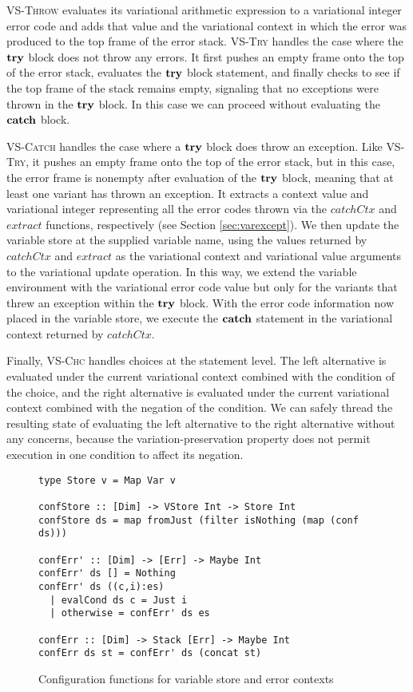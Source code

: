 \documentclass[12pt,oneside]{book}
\begin{document}
\textsc{VS-Throw} evaluates its variational arithmetic expression to a variational integer error code and adds that value and the variational context
in which the error was produced to the top frame of the error stack. \textsc{VS-Try} handles the case where the $\textbf{\textup{\textrm{try}}}$ block does not throw
any errors. It first pushes an empty frame onto the top of the error stack, evaluates the $\textbf{\textup{\textrm{try}}}$ block statement, and finally checks to see if
the top frame of the stack remains empty, signaling that no exceptions were thrown in the $\textbf{\textup{\textrm{try}}}$ block. In this case we can proceed without evaluating the $\textbf{\textup{\textrm{catch}}}$ block.

\textsc{VS-Catch} handles the case where a $\textbf{\textup{\textrm{try}}}$ block does throw an exception. Like \textsc{VS-Try}, it pushes an empty frame onto the top of the error
stack, but in this case, the error frame is nonempty after evaluation of the $\textbf{\textup{\textrm{try}}}$ block, meaning that at least one variant has thrown an exception.
It extracts a context value and variational integer representing all the error codes thrown via the $\mathit{catchCtx}$ and $\mathit{extract}$ functions, respectively (see
Section \ref{sec:varexcept}). We then update the variable store at the supplied variable name, using the values returned by $\mathit{catchCtx}$ and $\mathit{extract}$
as the variational context and variational value arguments to the variational update operation. In this way, we extend the variable environment with the variational
error code value but only for the variants that threw an exception within the $\textbf{\textup{\textrm{try}}}$ block. With the error code information now placed in the variable store,
we execute the $\textbf{\textup{\textrm{catch}}}$ statement in the variational context returned by $\mathit{catchCtx}$.

Finally, \textsc{VS-Chc} handles choices at the statement level. The left alternative is evaluated under the current variational context combined with the condition of
the choice, and the right alternative is evaluated under the current variational context combined with the negation of the condition.
We can safely thread the resulting state of evaluating the left alternative to the right alternative without any concerns, because the variation-preservation property
does not permit execution in one condition to affect its negation.

\begin{figure}
\begin{lstlisting}
type Store v = Map Var v

confStore :: [Dim] -> VStore Int -> Store Int
confStore ds = map fromJust (filter isNothing (map (conf ds)))

confErr' :: [Dim] -> [Err] -> Maybe Int
confErr' ds [] = Nothing
confErr' ds ((c,i):es)
  | evalCond ds c = Just i
  | otherwise = confErr' ds es

confErr :: [Dim] -> Stack [Err] -> Maybe Int
confErr ds st = confErr' ds (concat st)
\end{lstlisting}
\caption{Configuration functions for variable store and error contexts}
\label{fig:confstmt}
\end{figure}
\end{document}
